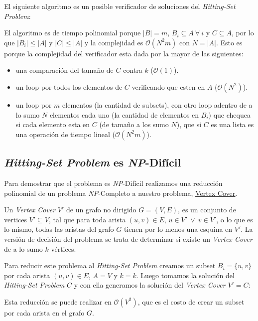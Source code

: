 El siguiente algoritmo es un posible verificador de soluciones del
\textit{Hitting-Set Problem}:



El algoritmo es de tiempo polinomial porque $|B| = m$, $B_i \subseteq A \
\forall \ i$ y $C \subseteq A$, por lo que $|B_i| \le |A|$ y $|C| \le |A|$ y la
complejidad es $\mathcal{O}(N^2m)$ con $N = |A|$. Esto es porque la complejidad
del verificador esta dada por la mayor de las siguientes:

\begin{itemize}
    \item una comparación del tamaño de $C$ contra $k$ ($\mathcal{O}(1)$).

    \item un loop por todos los elementos de $C$ verificando que esten en $A$
    ($\mathcal{O}(N^2)$).

    \item un loop por $m$ elementos (la cantidad de subsets), con otro loop
    adentro de a lo sumo $N$ elementos cada uno (la cantidad de elementos en
    $B_i$) que chequea si cada elemento esta en $C$ (de tamaño a los sumo $N$),
    que si $C$ es una lista es una operación de tiempo lineal
    ($\mathcal{O}(N^2m)$).
\end{itemize}

\subsection{\textit{Hitting-Set Problem} es \textit{NP}-Difícil}

Para demostrar que el problema es \textit{NP}-Difícil realizamos una reducción
polinomial de un problema \textit{NP}-Completo a nuestro problema,
\href{https://en.wikipedia.org/wiki/Vertex_cover}{\underline{Vertex Cover}}.

Un \textit{Vertex Cover} $V'$ de un grafo no dirigido $G = (V, E)$, es un
conjunto de vertices $V' \subseteq V$, tal que para toda arista $(u, v) \in E$,
$u \in V'\ \lor\ v \in V'$, o lo que es lo mismo, todas las aristas del grafo
$G$ tienen por lo menos una esquina en $V'$. La versión de decisión del
problema se trata de determinar si existe un \textit{Vertex Cover} de a lo sumo
$k$ vértices.

Para reducir este problema al \textit{Hitting-Set Problem} creamos un subset
$B_i = \{ u, v \}$ por cada arista $(u, v) \in E$, $A = V$ y $k = k$. Luego
tomamos la solución del \textit{Hitting-Set Problem} $C$ y con ella generamos
la solución del \textit{Vertex Cover} $V' = C$:



Esta reducción se puede realizar en $\mathcal{O}(V^2)$, que es el costo de
crear un subset por cada arista en el grafo $G$.
